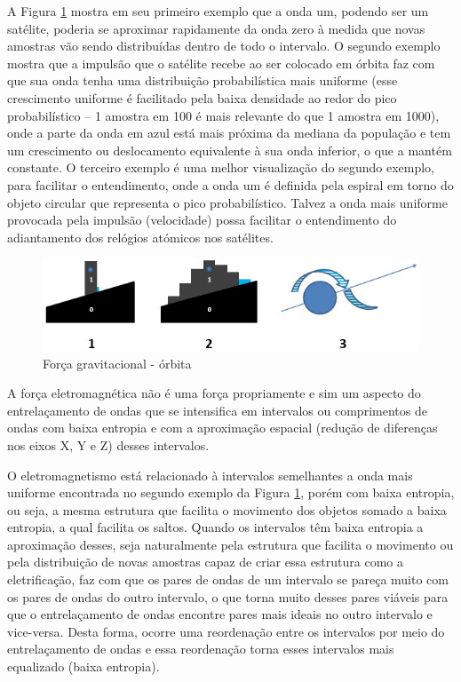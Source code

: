 A Figura \ref{fig:consciousness_gravitational_orbit} mostra em seu primeiro exemplo que a onda um, podendo ser um satélite, poderia se aproximar rapidamente da onda zero à medida que novas amostras vão sendo distribuídas dentro de todo o intervalo. O segundo exemplo mostra que a impulsão que o satélite recebe ao ser colocado em órbita faz com que sua onda tenha uma distribuição probabilística mais uniforme (esse crescimento uniforme é facilitado pela baixa densidade ao redor do pico probabilístico – 1 amostra em 100 é mais relevante do que 1 amostra em 1000), onde a parte da onda em azul está mais próxima da mediana da população e tem um crescimento ou deslocamento equivalente à sua onda inferior, o que a mantém constante. O terceiro exemplo é uma melhor visualização do segundo exemplo, para facilitar o entendimento, onde a onda um é definida pela espiral em torno do objeto circular que representa o pico probabilístico. Talvez a onda mais uniforme provocada pela impulsão (velocidade) possa facilitar o entendimento do adiantamento dos relógios atómicos nos satélites.
	\begin{figure}[H]
	\caption{Força gravitacional - órbita}
	\label{fig:consciousness_gravitational_orbit}
	\centering
	\includegraphics[scale=.9]{sections/images/consciousness_gravitational_orbit.jpg}
	\end{figure}

A força eletromagnética não é uma força propriamente e sim um aspecto do entrelaçamento de ondas que se intensifica em intervalos ou comprimentos de ondas com baixa entropia e com a aproximação espacial (redução de diferenças nos eixos X, Y e Z) desses intervalos.

O eletromagnetismo está relacionado à intervalos semelhantes a onda mais uniforme encontrada no segundo exemplo da Figura \ref{fig:consciousness_gravitational_orbit}, porém com baixa entropia, ou seja, a mesma estrutura que facilita o movimento dos objetos somado a baixa entropia, a qual facilita os saltos. Quando os intervalos têm baixa entropia a aproximação desses, seja naturalmente pela estrutura que facilita o movimento ou pela distribuição de novas amostras capaz de criar essa estrutura como a eletrificação, faz com que os pares de ondas de um intervalo se pareça muito com os pares de ondas do outro intervalo, o que torna muito desses pares viáveis para que o entrelaçamento de ondas encontre pares mais ideais no outro intervalo e vice-versa. Desta forma, ocorre uma reordenação entre os intervalos por meio do entrelaçamento de ondas e essa reordenação torna esses intervalos mais equalizado (baixa entropia).

